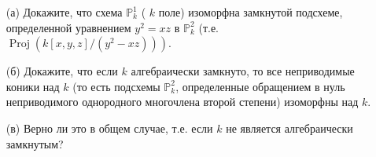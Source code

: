 \begin{prob}
\begin{itemize}
\item[(а)] Докажите, что схема $\mathbb{P}_k^1$ ( $k$ поле) изоморфна замкнутой подсхеме, определенной уравнением $y^2=x z$ в $\mathbb{P}_k^2$ (т.е. $\left.\operatorname{Proj}\left(k[x, y, z] /\left(y^2-x z\right)\right)\right)$.
\item[(б)] Докажите, что если $k$ алгебраически замкнуто, то все неприводимые коники над $k$ (то есть подсхемы $\mathbb{P}_k^2$, определенные обращением в нуль неприводимого однородного многочлена второй степени) изоморфны над $k$.
\item[(в)] Верно ли это в общем случае, т.е. если $k$ не является алгебраически замкнутым?
\end{itemize}
\end{prob}
